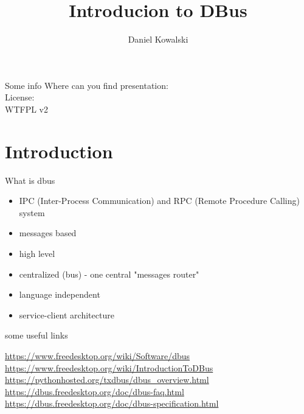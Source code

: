 \documentclass{beamer}
\title[Introducion to d-bus]{Introducion to DBus}
\author{Daniel Kowalski}
\date{}
\begin{document}
\begin{frame}
\titlepage
\end{frame}


\begin{frame}{Some info}
Where can you find presentation:\\
License:\\

WTFPL v2
\end{frame}

\begin{frame}
  \tableofcontents
\end{frame}

\section{Introduction}

\begin{frame}{What is dbus}
  \begin{itemize}
    \item IPC (Inter-Process Communication) and RPC (Remote Procedure Calling) system
    \item messages based
    \item high level
    \item centralized (bus) - one central "messages router"
    \item language independent
    \item service-client architecture
  \end{itemize}
  \vfill
  \begin{exampleblock}{some useful links}
    \begin{small}
      \url{https://www.freedesktop.org/wiki/Software/dbus}\\
      \url{https://www.freedesktop.org/wiki/IntroductionToDBus}\\
      \url{https://pythonhosted.org/txdbus/dbus\_overview.html}\\
      \url{https://dbus.freedesktop.org/doc/dbus-faq.html}\\
      \url{https://dbus.freedesktop.org/doc/dbus-specification.html}\\
    \end{small}  
  \end{exampleblock}
\end{frame}
\end{document}
